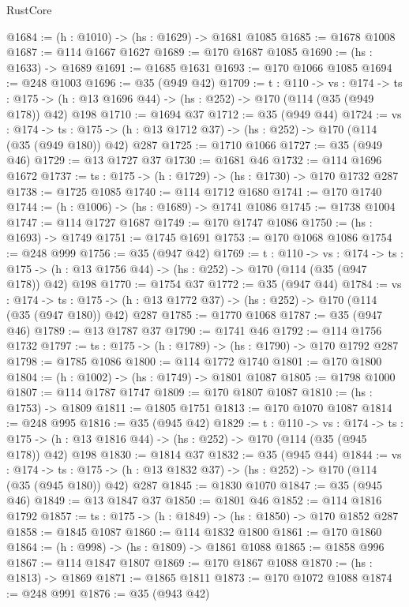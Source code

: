 \begin{lexlean}{RustCore}
\begin{coremodule}
@1684 := (h : @1010) -> (hs : @1629) -> @1681 @1085
@1685 := @1678 @1008
@1687 := @114 @1667 @1627
@1689 := @170 @1687 @1085
@1690 := (hs : @1633) -> @1689
@1691 := @1685 @1631
@1693 := @170 @1066 @1085
@1694 := @248 @1003
@1696 := @35 (@949 @42)
@1709 := {t : @110} ->
  {vs : @174} ->
  {ts : @175} -> (h : @13 @1696 @44) -> (hs : @252) -> @170 (@114 (@35 (@949 @178)) @42) @198
@1710 := @1694 @37
@1712 := @35 (@949 @44)
@1724 := {vs : @174} ->
  {ts : @175} -> (h : @13 @1712 @37) -> (hs : @252) -> @170 (@114 (@35 (@949 @180)) @42) @287
@1725 := @1710 @1066
@1727 := @35 (@949 @46)
@1729 := @13 @1727 @37
@1730 := @1681 @46
@1732 := @114 @1696 @1672
@1737 := {ts : @175} -> (h : @1729) -> (hs : @1730) -> @170 @1732 @287
@1738 := @1725 @1085
@1740 := @114 @1712 @1680
@1741 := @170 @1740
@1744 := (h : @1006) -> (hs : @1689) -> @1741 @1086
@1745 := @1738 @1004
@1747 := @114 @1727 @1687
@1749 := @170 @1747 @1086
@1750 := (hs : @1693) -> @1749
@1751 := @1745 @1691
@1753 := @170 @1068 @1086
@1754 := @248 @999
@1756 := @35 (@947 @42)
@1769 := {t : @110} ->
  {vs : @174} ->
  {ts : @175} -> (h : @13 @1756 @44) -> (hs : @252) -> @170 (@114 (@35 (@947 @178)) @42) @198
@1770 := @1754 @37
@1772 := @35 (@947 @44)
@1784 := {vs : @174} ->
  {ts : @175} -> (h : @13 @1772 @37) -> (hs : @252) -> @170 (@114 (@35 (@947 @180)) @42) @287
@1785 := @1770 @1068
@1787 := @35 (@947 @46)
@1789 := @13 @1787 @37
@1790 := @1741 @46
@1792 := @114 @1756 @1732
@1797 := {ts : @175} -> (h : @1789) -> (hs : @1790) -> @170 @1792 @287
@1798 := @1785 @1086
@1800 := @114 @1772 @1740
@1801 := @170 @1800
@1804 := (h : @1002) -> (hs : @1749) -> @1801 @1087
@1805 := @1798 @1000
@1807 := @114 @1787 @1747
@1809 := @170 @1807 @1087
@1810 := (hs : @1753) -> @1809
@1811 := @1805 @1751
@1813 := @170 @1070 @1087
@1814 := @248 @995
@1816 := @35 (@945 @42)
@1829 := {t : @110} ->
  {vs : @174} ->
  {ts : @175} -> (h : @13 @1816 @44) -> (hs : @252) -> @170 (@114 (@35 (@945 @178)) @42) @198
@1830 := @1814 @37
@1832 := @35 (@945 @44)
@1844 := {vs : @174} ->
  {ts : @175} -> (h : @13 @1832 @37) -> (hs : @252) -> @170 (@114 (@35 (@945 @180)) @42) @287
@1845 := @1830 @1070
@1847 := @35 (@945 @46)
@1849 := @13 @1847 @37
@1850 := @1801 @46
@1852 := @114 @1816 @1792
@1857 := {ts : @175} -> (h : @1849) -> (hs : @1850) -> @170 @1852 @287
@1858 := @1845 @1087
@1860 := @114 @1832 @1800
@1861 := @170 @1860
@1864 := (h : @998) -> (hs : @1809) -> @1861 @1088
@1865 := @1858 @996
@1867 := @114 @1847 @1807
@1869 := @170 @1867 @1088
@1870 := (hs : @1813) -> @1869
@1871 := @1865 @1811
@1873 := @170 @1072 @1088
@1874 := @248 @991
@1876 := @35 (@943 @42)

\end{coremodule}
\end{lexlean}
